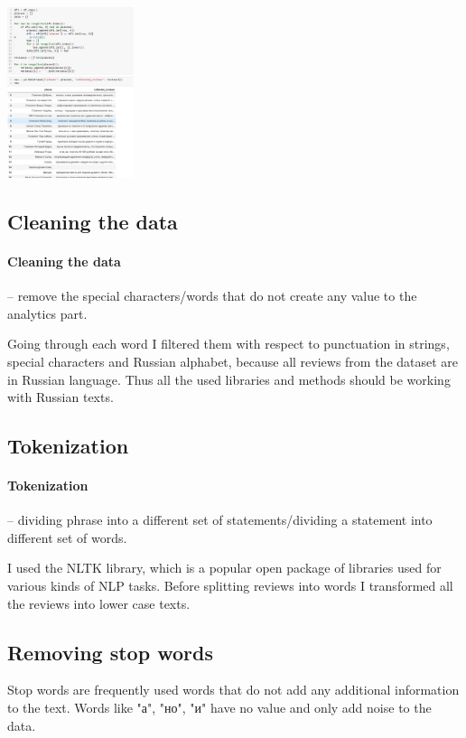 \documentclass{article}
\begin{document}
\begin{center}
\includegraphics[width=0.5\linewidth, right, height=5cm]{images/figure 6.jpg}
\end{center}

\subsection{Cleaning the data}
\setcounter{section}{9}
\paragraph{Cleaning the data} -- remove the special characters/words that do not create any value to the analytics part.\cite{pradha2019effective}

Going through each word I filtered them with respect to punctuation in strings, special characters and Russian alphabet, because all reviews from the dataset are in Russian language. Thus all the used libraries and methods should be working with Russian texts.\cite{pazelskaya2011method}

\subsection{Tokenization}
\setcounter{section}{9}
\paragraph{Tokenization} -- dividing phrase into a different set of statements/dividing a statement into different set of words.

I used the NLTK library, which is a popular open package of libraries used for various kinds of NLP tasks. Before splitting reviews into words I transformed all the reviews into lower case texts.

\subsection{Removing stop words}
\setcounter{section}{9}
Stop words are frequently used words that do not add any additional information to the text. Words like  "а", "но", "и"  have no value and only add noise to the data.
\end{document}
